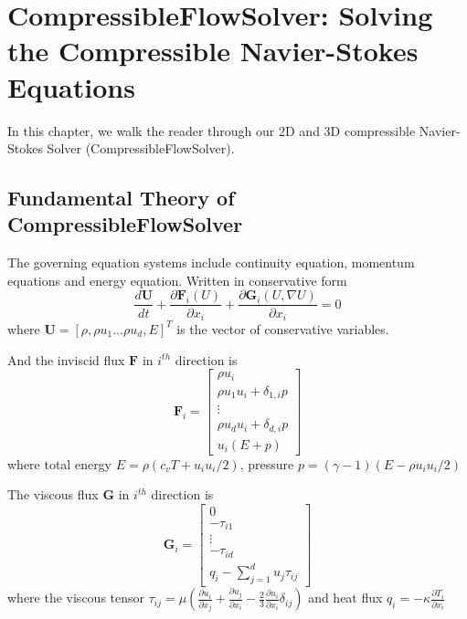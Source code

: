 \chapter{CompressibleFlowSolver: Solving the Compressible Navier-Stokes Equations}

In this chapter, we walk the reader through our 2D and 3D compressible Navier-Stokes Solver (CompressibleFlowSolver). 
\section{Fundamental Theory of CompressibleFlowSolver}
The governing equation systems include continuity equation, momentum equations and energy equation. Written in conservative form 
\begin{equation}\label{eq1}
  \frac{d \textbf{U}}{d t}+
  \frac{\partial \textbf{F}_{i}(U)}{\partial x_{i}}+
  \frac{\partial \textbf{G}_{i}(U,\nabla U)}{\partial x_{i}}
  =0
\end{equation}
where $\textbf{U}=[\rho,\rho u_{1} \hdots \rho u_{d},E]^{T}$ is the vector of conservative variables.

And the inviscid flux $\textbf{F}$ in $i^{th}$ direction is
\begin{equation}
  \textbf{F}_{i}=
\begin{bmatrix}
  \rho u_{i}\\
  \rho u_{1}u_{i}+\delta_{1,i}p\\
  \vdots\\
  \rho u_{d}u_{i}+\delta_{d,i}p\\
  u_{i}(E+p)
\end{bmatrix}
\end{equation}
where total energy $E=\rho (c_{v}T+u_{i}u_{i}/2)$, pressure $p=(\gamma-1)(E-\rho u_{i}u_{i}/2)$

The viscous flux $\textbf{G}$ in $i^{th}$ direction is
\begin{equation}\label{eq7}
  \textbf{G}_{i}=
\begin{bmatrix}
  0\\
  -\tau_{i1}\\
  \vdots\\
  -\tau_{id}\\
  q_{i}-\sum\limits_{j=1}^{d}{u_{j}\tau_{ij}}
\end{bmatrix}
\end{equation}
where the viscous tensor $\tau_{ij}=\mu(\frac{\partial u_{i}}{\partial x_{j}}+\frac{\partial u_{j}}{\partial x_{i}}-\frac{2}{3}\frac{\partial u_{i}}{\partial x_{i}}\delta_{ij})$ and heat flux $q_{i}=-\kappa \frac{\partial T_{i}}{\partial x_{i}}$

